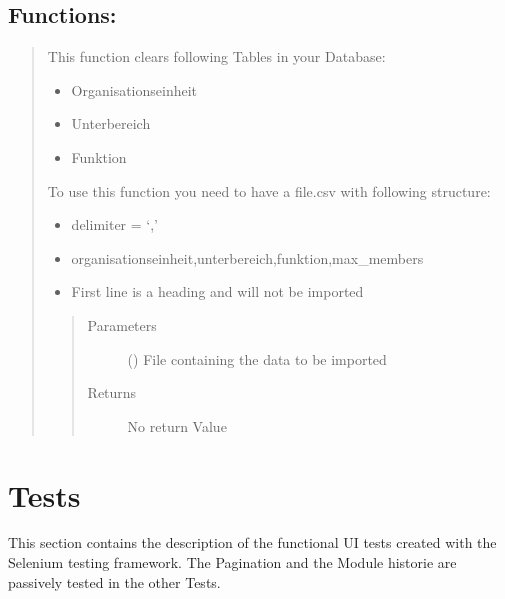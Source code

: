 \documentclass[letterpaper,10pt,english]{sphinxmanual}
\begin{document}
\subsection{Functions:}
\label{\detokenize{masterCodeDoc:functions}}\begin{quote}


\begin{fulllineitems}
This function clears following Tables in your Database:
\begin{itemize}
\item {} 
Organisationseinheit

\item {} 
Unterbereich

\item {} 
Funktion

\end{itemize}

To use this function you need to have a file.csv with following structure:
\begin{itemize}
\item {} 
delimiter = ‘,’

\item {} 
organisationseinheit,unterbereich,funktion,max\_members

\item {} 
First line is a heading and will not be imported

\end{itemize}
\begin{quote}\begin{description}
\item[{Parameters}] \leavevmode
{} () \textendash{} File containing the data to be imported

\item[{Returns}] \leavevmode
No return Value

\end{description}\end{quote}

\end{fulllineitems}

\end{quote}


\section{Tests}
\label{\detokenize{masterCodeDoc:tests}}
This section contains the description of the functional UI tests created with the Selenium testing framework. The Pagination
and the Module historie are passively tested in the other Tests.
\end{document}
